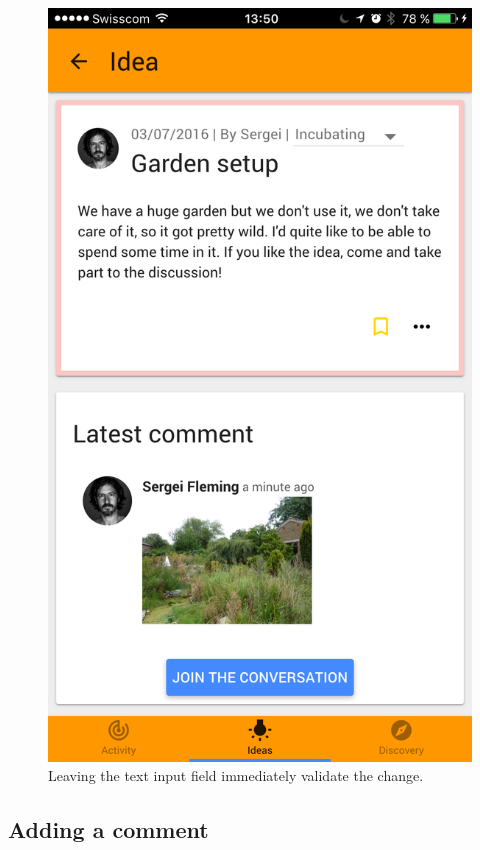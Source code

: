 \documentclass[a4paper,12pt,twoside]{article}
\begin{document}
\begin{figure}[!htb]
\begin{minipage}[t]{.32\textwidth}
        \includegraphics[width=\textwidth]{images/flow_updateIdeaName_3.png}
        \caption{Leaving the text input field immediately validate the change.}
    \end{minipage}
\end{figure}

\clearpage
\subsection{Adding a comment}
\end{document}
